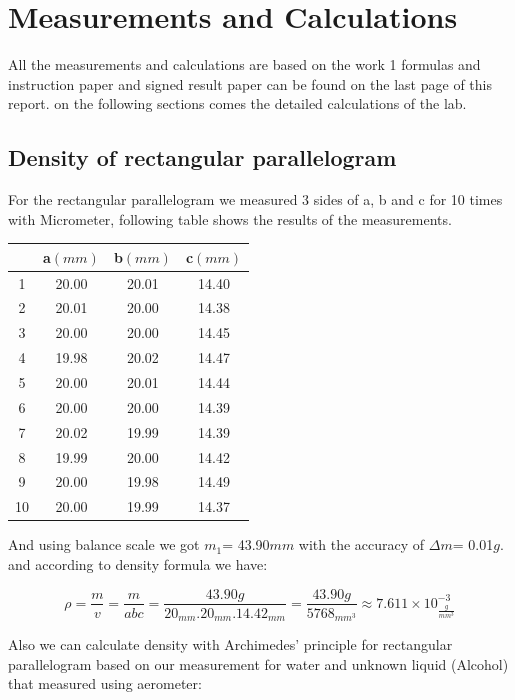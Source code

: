 \documentclass[a4paper, 12pt]{article}
\begin{document}
\section{Measurements and Calculations}

All the measurements and calculations are based on the work 1 formulas and instruction paper and signed result paper can be found on the last page of this report. on the following sections comes the detailed calculations of the lab.

\subsection{Density of rectangular parallelogram}

For the rectangular parallelogram we measured 3 sides of a, b and c for 10 times with Micrometer, following table shows the results of the measurements.

\begin{center}
	\begin{tabular}{||c c c c||} 
		\hline
		   &  a\((mm)\) & b\((mm)\)  &  c\((mm)\)  \\ [0.5ex] 
		\hline\hline
		1 & 20.00 & 20.01 & 14.40 \\ 
		\hline
		2 & 20.01 & 20.00 & 14.38 \\
		\hline
		3 & 20.00 & 20.00 & 14.45 \\
		\hline
		4 & 19.98 & 20.02 & 14.47 \\
		\hline
		5 & 20.00 & 20.01 & 14.44 \\
		\hline
		6 & 20.00 & 20.00 & 14.39 \\
		\hline
		7 & 20.02 & 19.99 & 14.39 \\
		\hline
		8 & 19.99 & 20.00 & 14.42 \\
		\hline
		9 & 20.00 & 19.98 & 14.49 \\
		\hline
		10 & 20.00 & 19.99 &  14.37 \\ [1ex] 
		\hline
	\end{tabular}
\end{center}

And using balance scale we got \(m_{1}\)= 43.90\(mm\) with the accuracy of \(\varDelta m\)= 0.01\(g\). and according to density formula we have:

\[
\rho = \frac{m}{v} = \frac{m}{abc} = \frac{43.90g}{20_{mm}.20_{mm}.14.42_{mm}} = \frac{43.90g}{5768_{mm^{3}}} \approx 7.611\times10^{-3}_{\frac{g}{mm^{3}}}
\]

Also we can calculate density with Archimedes’ principle for rectangular parallelogram based on our measurement for water and unknown liquid (Alcohol) that measured using aerometer:
\end{document}

